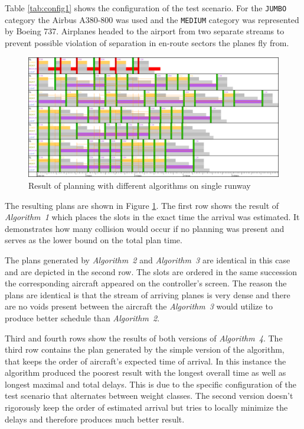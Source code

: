 Table \ref{tab:config1} shows the configuration of the test scenario. For the \texttt{JUMBO} category the Airbus A380-800 was used and the \texttt{MEDIUM} category was represented by Boeing 737. Airplanes headed to the airport from two separate streams to prevent possible violation of separation in en-route sectors the planes fly from.

\begin{figure}[h]
    \centering
    \includegraphics[width=\textwidth]{figures/1rwy-alternating.png}
    \caption{Result of planning with different algorithms on single runway}
    \label{fig:1rwy-alternating}
\end{figure}

The resulting plans are shown in Figure \ref{fig:1rwy-alternating}. The first row shows the result of {\em Algorithm~1} which places the slots in the exact time the arrival was estimated. It demonstrates how many collision would occur if no planning was present and serves as the lower bound on the total plan time.

The plans generated by {\em Algorithm~2} and {\em Algorithm~3} are identical in this case and are depicted in the second row. The slots are ordered in the same succession the corresponding aircraft appeared on the controller's screen. The reason the plans are identical is that the stream of arriving planes is very dense and there are no voids present between the aircraft the {\em Algorithm~3} would utilize to produce better schedule than {\em Algorithm~2}.

Third and fourth rows show the results of both versions of {\em Algorithm~4}. The third row contains the plan generated by the simple version of the algorithm, that keeps the order of aircraft's expected time of arrival. In this instance the algorithm produced the poorest result with the longest overall time as well as longest maximal and total delays. This is due to the specific configuration of the test scenario that alternates between weight classes. The second version doesn't rigorously keep the order of estimated arrival but tries to locally minimize the delays and therefore produces much better result.

